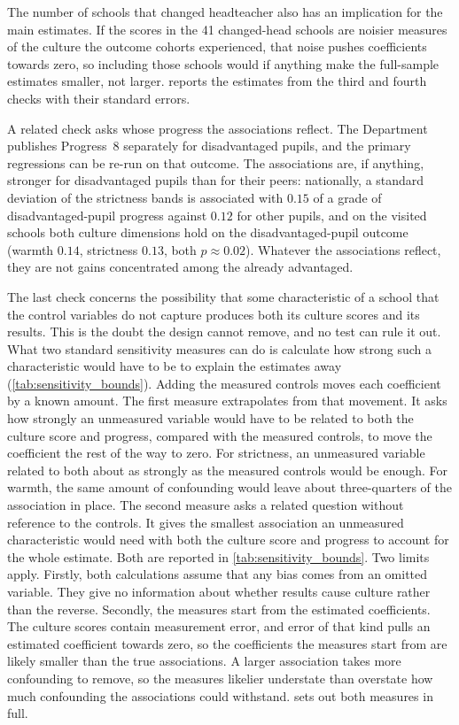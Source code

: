 The number of schools that changed headteacher also has an implication for the main estimates. If the scores in the 41 changed-head schools are noisier measures of the culture the outcome cohorts experienced, that noise pushes coefficients towards zero, so including those schools would if anything make the full-sample estimates smaller, not larger.  reports the estimates from the third and fourth checks with their standard errors.



A related check asks whose progress the associations reflect. The Department publishes Progress~8 separately for disadvantaged pupils, and the primary regressions can be re-run on that outcome. The associations are, if anything, stronger for disadvantaged pupils than for their peers: nationally, a standard deviation of the strictness bands is associated with $0.15$ of a grade of disadvantaged-pupil progress against $0.12$ for other pupils, and on the visited schools both culture dimensions hold on the disadvantaged-pupil outcome (warmth $0.14$, strictness $0.13$, both $p \approx 0.02$). Whatever the associations reflect, they are not gains concentrated among the already advantaged.

The last check concerns the possibility that some characteristic of a school that the control variables do not capture produces both its culture scores and its results. This is the doubt the design cannot remove, and no test can rule it out. What two standard sensitivity measures can do is calculate how strong such a characteristic would have to be to explain the estimates away (\cref{tab:sensitivity_bounds}). Adding the measured controls moves each coefficient by a known amount. The first measure extrapolates from that movement. It asks how strongly an unmeasured variable would have to be related to both the culture score and progress, compared with the measured controls, to move the coefficient the rest of the way to zero. For strictness, an unmeasured variable related to both about as strongly as the measured controls would be enough. For warmth, the same amount of confounding would leave about three-quarters of the association in place. The second measure asks a related question without reference to the controls. It gives the smallest association an unmeasured characteristic would need with both the culture score and progress to account for the whole estimate. Both are reported in \cref{tab:sensitivity_bounds}. Two limits apply. Firstly, both calculations assume that any bias comes from an omitted variable. They give no information about whether results cause culture rather than the reverse. Secondly, the measures start from the estimated coefficients. The culture scores contain measurement error, and error of that kind pulls an estimated coefficient towards zero, so the coefficients the measures start from are likely smaller than the true associations. A larger association takes more confounding to remove, so the measures likelier understate than overstate how much confounding the associations could withstand.  sets out both measures in full.

